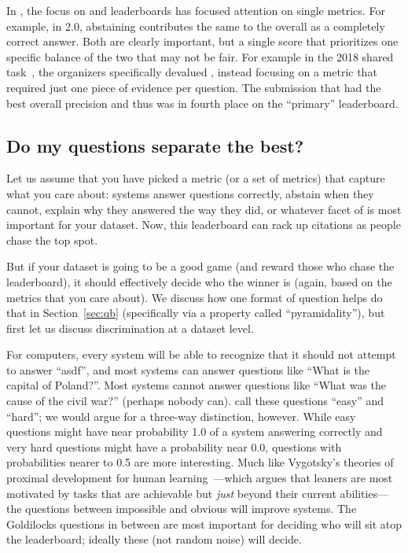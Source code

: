 In \qa{}, the focus on  and leaderboards has focused attention on single metrics.
For example, in \squad{} 2.0, abstaining contributes the same to the overall \fone{} as a completely correct answer.
Both are clearly important, but a single score that prioritizes one specific balance of the two that may not be fair.
For example in the 2018 \fever{} shared task~\cite{fever-18}, the organizers specifically devalued \fone{}, instead focusing on a metric that required just one piece of evidence per question.
The submission that had the best overall precision and \fone{} thus was in fourth place on the ``primary'' leaderboard.

\subsection{Do my questions separate the best?}
\label{sec:discriminative}

Let us assume that you have picked a metric (or a set of metrics) that capture what you care about:
systems answer questions correctly,
abstain when they cannot,
explain why they answered the way they did,
or whatever facet of  is most important for your dataset.
Now, this leaderboard can rack up citations as people chase the top spot.

But if your dataset is going to be a good game (and reward those who chase the leaderboard), it should effectively decide who the winner is (again, based on the metrics that you care about).
We discuss how one format of question helps do that in Section~\ref{sec:qb} (specifically via a property called ``pyramidality''), but first let us discuss discrimination at a dataset level.

For computers, every system will be able to recognize that it should not attempt to answer ``asdf'', and most systems can answer questions like ``What is the capital of Poland?''.
Most systems cannot answer questions like ``What was the cause of the  civil war?'' (perhaps nobody can).
 call these questions ``easy'' and ``hard''; we would argue for a three-way distinction, however.
While easy questions might have near probability 1.0 of a system answering correctly and very hard questions might have a probability near 0.0, questions with probabilities nearer to 0.5 are more interesting.
Much like Vygotsky's theories of proximal development for human learning~\cite{chaiklin-03}---which argues that leaners are most motivated by tasks that are achievable but \emph{just} beyond their current abilities---the questions between impossible and obvious will improve  systems.
The Goldilocks questions in between are most important for deciding who will sit atop the leaderboard; ideally these (not random noise) will decide.


